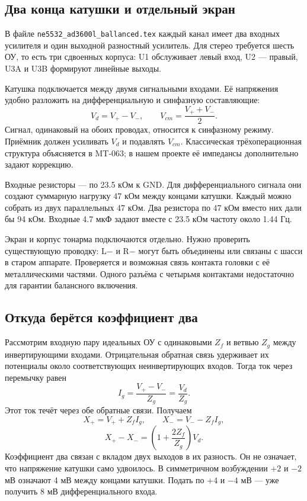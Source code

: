 \documentclass[a4paper,11pt]{article}
\newcommand{\file}[1]{\nolinkurl{#1}}
\begin{document}
\subsection{Два конца катушки и отдельный экран}

В файле \file{ne5532_ad3600l_ballanced.tex} каждый канал имеет два входных
усилителя и один выходной разностный усилитель. Для стерео требуется шесть ОУ,
то есть три сдвоенных корпуса: U1 обслуживает левый вход, U2 — правый,
U3A и U3B формируют линейные выходы.

Катушка подключается между двумя сигнальными входами. Её напряжения удобно
разложить на дифференциальную и синфазную составляющие:
\[
 V_d=V_+-V_-,\qquad V_{cm}=\frac{V_++V_-}{2}.
\]
Сигнал, одинаковый на обоих проводах, относится к синфазному режиму.
Приёмник должен усиливать $V_d$ и подавлять $V_{cm}$.
Классическая трёхоперационная структура объясняется в MT-063\cite{adi-ina};
в нашем проекте её импедансы дополнительно задают коррекцию.

Входные резисторы — по 23.5 кОм к GND. Для дифференциального сигнала они
создают суммарную нагрузку 47 кОм между концами катушки. Каждый можно собрать
из двух параллельных 47 кОм. Два резистора по 47 кОм вместо них дали бы 94 кОм.
Входные 4.7 мкФ задают вместе с 23.5 кОм частоту около 1.44 Гц.

Экран и корпус тонарма подключаются отдельно. Нужно проверить существующую
проводку: L− и R− могут быть объединены или связаны с шасси в старом аппарате.
Проверяется и возможная связь контакта головки с её металлическими частями.
Одного разъёма с четырьмя контактами недостаточно для гарантии балансного включения.

\subsection{Откуда берётся коэффициент два}

Рассмотрим входную пару идеальных ОУ с одинаковыми $Z_f$ и ветвью $Z_g$
между инвертирующими входами. Отрицательная обратная связь удерживает
их потенциалы около соответствующих неинвертирующих входов.
Тогда ток через перемычку равен
\[
 I_g=\frac{V_+-V_-}{Z_g}=\frac{V_d}{Z_g}.
\]
Этот ток течёт через обе обратные связи. Получаем
\[
 X_+=V_++Z_fI_g,\qquad X_-=V_--Z_fI_g,
\]
\[
 X_+-X_-=\left(1+\frac{2Z_f}{Z_g}\right)V_d.
\]
Коэффициент два связан с вкладом двух выходов в их разность.
Он не означает, что напряжение катушки само удвоилось.
В симметричном возбуждении $+2$ и $-2$ мВ означают 4 мВ между концами катушки.
Подать по $+4$ и $-4$ мВ — уже получить 8 мВ дифференциального входа.
\end{document}
